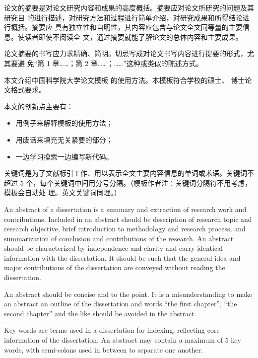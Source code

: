 \begin{cabstract}
  论文的摘要是对论文研究内容和成果的高度概括。摘要应对论文所研究的问题及其研究目
  的进行描述，对研究方法和过程进行简单介绍，对研究成果和所得结论进行概括。摘要应
  具有独立性和自明性，其内容应包含与论文全文同等量的主要信息。使读者即使不阅读全
  文，通过摘要就能了解论文的总体内容和主要成果。

  论文摘要的书写应力求精确、简明。切忌写成对论文书写内容进行提要的形式，尤其要避
  免“第 1 章……；第 2 章……；……”这种或类似的陈述方式。

  本文介绍中国科学院大学论文模板 \ucasthesis{} 的使用方法。本模板符合学校的硕士、
  博士论文格式要求。

  本文的创新点主要有：
  \begin{itemize}
    \item 用例子来解释模板的使用方法；
    \item 用废话来填充无关紧要的部分；
    \item 一边学习摸索一边编写新代码。
  \end{itemize}

  关键词是为了文献标引工作、用以表示全文主要内容信息的单词或术语。关键词不超过 5
  个，每个关键词中间用分号分隔。（模板作者注：关键词分隔符不用考虑，模板会自动处
  理。英文关键词同理。）
\end{cabstract}


\begin{eabstract} 
   An abstract of a dissertation is a summary and extraction of research work
   and contributions. Included in an abstract should be description of research
   topic and research objective, brief introduction to methodology and research
   process, and summarization of conclusion and contributions of the
   research. An abstract should be characterized by independence and clarity and
   carry identical information with the dissertation. It should be such that the
   general idea and major contributions of the dissertation are conveyed without
   reading the dissertation. 

   An abstract should be concise and to the point. It is a misunderstanding to
   make an abstract an outline of the dissertation and words ``the first
   chapter'', ``the second chapter'' and the like should be avoided in the
   abstract.

   Key words are terms used in a dissertation for indexing, reflecting core
   information of the dissertation. An abstract may contain a maximum of 5 key
   words, with semi-colons used in between to separate one another.
\end{eabstract}

